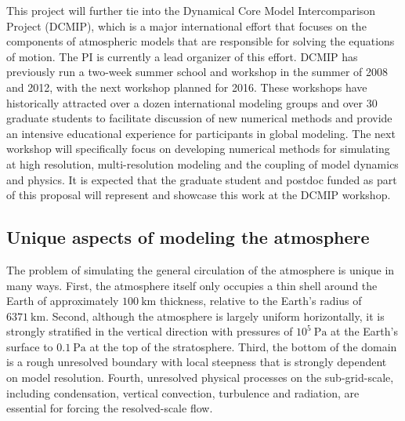 \documentclass[11pt]{article}
\begin{document}
This project will further tie into the Dynamical Core Model Intercomparison Project (DCMIP), which is a major international effort that focuses on the components of atmospheric models that are responsible for solving the equations of motion.  The PI is currently a lead organizer of this effort.  DCMIP has previously run a two-week summer school and workshop in the summer of 2008 and 2012, with the next workshop planned for 2016.  These workshops have historically attracted over a dozen international modeling groups and over 30 graduate students to facilitate discussion of new numerical methods and provide an intensive educational experience for participants in global modeling.  The next workshop will specifically focus on developing numerical methods for simulating at high resolution, multi-resolution modeling and the coupling of model dynamics and physics.  It is expected that the graduate student and postdoc funded as part of this proposal will represent and showcase this work at the DCMIP workshop.

\subsection{Unique aspects of modeling the atmosphere}

The problem of simulating the general circulation of the atmosphere is unique in many ways.  First, the atmosphere itself only occupies a thin shell around the Earth of approximately $100\ \mbox{km}$ thickness, relative to the Earth's radius of $6371\ \mbox{km}$.  Second, although the atmosphere is largely uniform horizontally, it is strongly stratified in the vertical direction with pressures of $10^5\ \mbox{Pa}$ at the Earth's surface to $0.1\ \mbox{Pa}$ at the top of the stratosphere.  Third, the bottom of the domain is a rough unresolved boundary with local steepness that is strongly dependent on model resolution.  Fourth, unresolved physical processes on the sub-grid-scale, including condensation, vertical convection, turbulence and radiation, are essential for forcing the resolved-scale flow.
\end{document}
